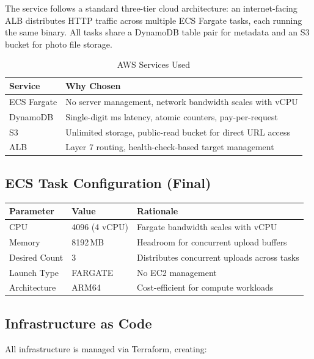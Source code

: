 \documentclass[11pt]{article}
\begin{document}
The service follows a standard three-tier cloud architecture: an internet-facing ALB distributes HTTP traffic across multiple ECS Fargate tasks, each running the same binary. All tasks share a DynamoDB table pair for metadata and an S3 bucket for photo file storage.

\begin{table}[H]
\centering
\caption{AWS Services Used}
\begin{tabular}{ll}
\toprule
\textbf{Service} & \textbf{Why Chosen} \\
\midrule
ECS Fargate & No server management, network bandwidth scales with vCPU \\
DynamoDB & Single-digit ms latency, atomic counters, pay-per-request \\
S3 & Unlimited storage, public-read bucket for direct URL access \\
ALB & Layer 7 routing, health-check-based target management \\
\bottomrule
\end{tabular}
\end{table}

\subsection{ECS Task Configuration (Final)}

\begin{table}[H]
\centering
\begin{tabular}{lll}
\toprule
\textbf{Parameter} & \textbf{Value} & \textbf{Rationale} \\
\midrule
CPU & 4096 (4 vCPU) & Fargate bandwidth scales with vCPU \\
Memory & 8192\,MB & Headroom for concurrent upload buffers \\
Desired Count & 3 & Distributes concurrent uploads across tasks \\
Launch Type & FARGATE & No EC2 management \\
Architecture & ARM64 & Cost-efficient for compute workloads \\
\bottomrule
\end{tabular}
\end{table}

\subsection{Infrastructure as Code}

All infrastructure is managed via Terraform, creating:
\end{document}
